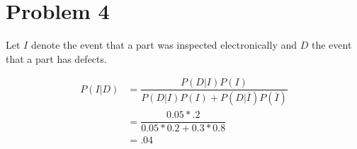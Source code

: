 \documentclass[11pt]{article}
\begin{document}
\section*{Problem 4}
Let $I$ denote the event that a part was inspected electronically and $D$ the event that a part has defects.

\begin{align*}
	P(I | D) &= \dfrac{ P(D | I)P(I) }{P(D | I)P(I) + P(D | \overline{I} )P(\overline{I})}\\
	&= \dfrac{0.05 * .2}{ 0.05 * 0.2 + 0.3 * 0.8}\\
	&= .04
\end{align*}
\end{document}
